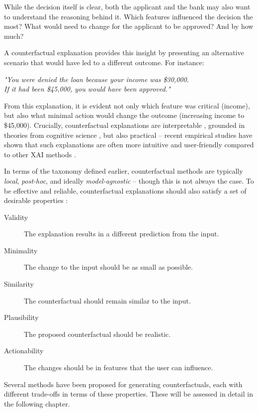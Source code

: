 While the decision itself is clear, both the applicant and the bank may also want to understand the reasoning behind it. Which features influenced the decision the most? What would need to change for the applicant to be approved? And by how much?

A counterfactual explanation provides this insight by presenting an alternative scenario that would have led to a different outcome. For instance:

\begin{center}
    \textit{"You were denied the loan because your income was \$30,000.\\
        If it had been \$45,000, you would have been approved."}
\end{center}

From this explanation, it is evident not only which feature was critical (income), but also what minimal action would change the outcome (increasing income to \$45,000).
Crucially, counterfactual explanations are interpretable \cite{pearl2009causal},
grounded in theories from cognitive science \cite{byrne2019counterfactuals},
but also practical -- recent empirical studies have shown that such explanations are often
more intuitive and user-friendly compared to other XAI methods \cite{warren2022features}.

In terms of the taxonomy defined earlier, counterfactual methods are typically \emph{local}, \emph{post-hoc}, and ideally \emph{model-agnostic} -- though this is not always the case.
To be effective and reliable, counterfactual explanations should also satisfy a set of desirable properties \cite{guidotti2018survey}:

\begin{description}
    \item[Validity] The explanation results in a different prediction from the input.
    \item[Minimality] The change to the input should be as small as possible.
    \item[Similarity] The counterfactual should remain similar to the input.
    \item[Plausibility] The proposed counterfactual should be realistic.
    \item[Actionability] The changes should be in features that the user can influence.
\end{description}

Several methods have been proposed for generating counterfactuals,
each with different trade-offs in terms of these properties.
These will be assessed in detail in the following chapter.

